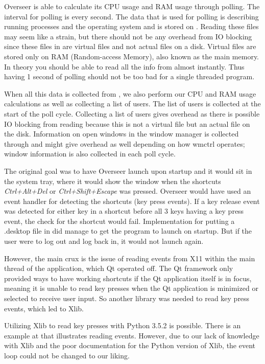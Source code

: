 \documentclass[12pt]{article}
\begin{document}
Overseer is able to calculate its CPU usage and RAM usage through polling.
The interval for polling is every second.
The data that is used for polling is describing running processes and the operating system and is stored on .
Reading these files may seem like a strain, but there should not be any overhead from IO blocking since these files in  are virtual files and not actual files on a disk.
Virtual files are stored only on RAM (Random-access Memory), also known as the main memory.
In theory you should be able to read all the info from  almost instantly.
Thus having 1 second of polling should not be too bad for a single threaded program.

When all this data is collected from , we also perform our CPU and RAM usage calculations as well as collecting a list of users.
The list of users is collected at the start of the poll cycle.
Collecting a list of users gives overhead as there is possible IO blocking from reading  because this is not a virtual file but an actual file on the disk.
Information on open windows in the window manager is collected through  and might give overhead as well depending on how wmctrl operates; window information is also collected in each poll cycle. 

The original goal was to have Overseer launch upon startup and it would sit in the system tray, where it would show the window when the shortcuts \emph{Ctrl+Alt+Del} or \emph{Ctrl+Shift+Escape} was pressed.
Overseer would have used an event handler for detecting the shortcuts (key press events).
If a key release event was detected for either key in a shortcut before all 3 keys having a key press event, the check for the shortcut would fail.
Implementation for putting a .desktop file in  did manage to get the program to launch on startup. But if the user were to log out and log back in, it would not launch again.

However, the main crux is the issue of reading events from X11 within the main thread of the application, which Qt operated off.
The Qt framework only provided ways to have working shortcuts if the Qt application itself is in focus, meaning it is unable to read key presses when the Qt application is minimized or selected to receive user input.
So another library was needed to read key press events, which led to Xlib.

Utilizing Xlib to read key presses with Python 3.5.2 is possible.
There is an example at  that illustrates reading events.
However, due to our lack of knowledge with Xlib and the poor documentation \cite{badDocumentation} for the Python version of Xlib, the event loop could not be changed to our liking.
\end{document}
